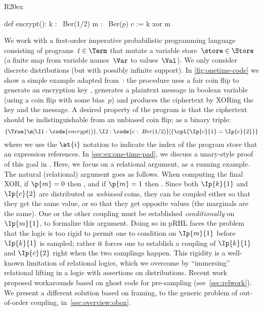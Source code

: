 \documentclass[acmsmall,nonacm,screen,appendix]{acmart}
\begin{document}
\begin{wrapfigure}[7]{R}{20ex}\begin{sourcecode*}[linewidth=.9\linewidth,xleftmargin=.1\linewidth,
    belowskip=-.5em,aboveskip=-1em,
    gobble=2
  ]
  def encrypt():
    k :~ Ber(1/2)
    m :~ Ber($p$)
    c := k xor m
  \end{sourcecode*}\caption{One time pad.}
  \label{fig:onetime-code}
\end{wrapfigure}
We work with a first-order imperative probabilistic programming language
consisting of programs~$t\in\Term$ that mutate a variable store~$\store\in\Store$
(\ie a finite map from variable names~$\Var$ to values~$\Val$).
We only consider discrete distributions
(but with possibly infinite support).
In \cref{fig:onetime-code} we show a simple example adapted from~\cite{barthe2019probabilistic}:
the  procedure uses a fair coin flip to generate an encryption key
, generates a plaintext message in boolean variable 
(using a coin flip with some bias~$p$)
and produces the ciphertext  by XORing the key and the message.
A desired property of the program is that the ciphertext should be
indistinguishable from an unbiased coin flip; as a binary triple:
\begin{equation}
  \{\True\}
  \m[
    \I1: \code{encrypt()},
    \I2: \code{c:~Ber(1/2)}
  ]
  \{
    \cpl{ \Ip{c}{1}=\Ip{c}{2} }
  \}
  \label{ex:xor:goal}
\end{equation}
where we use the $\at{i}$ notation to indicate the index of the program store that an expression references.
In \cref{sec:ex:one-time-pad}, we discuss a unary-style proof of this goal in \thelogic. Here, we focus on a relational argument, as a running example. The natural (relational) argument goes as follows.
When computing the final XOR,
  if $\p{m}=0$ then ,
  and if $\p{m}=1$ then .
Since both $\Ip{k}{1}$ and $\Ip{c}{2}$ are distributed as \emph{unbiased} coins,
they can be coupled either so that they get the same value,
or so that they get opposite values (the marginals are the same).
One or the other coupling must be established
\emph{conditionally} on~$\Ip{m}{1}$, to formalize this argument.
Doing so in pRHL faces the problem that the logic is too rigid to permit one to
condition on $\Ip{m}{1}$ before $\Ip{k}{1}$ is sampled; rather it forces one to establish a coupling of $\Ip{k}{1}$ and $\Ip{c}{2}$ right when the two samplings happen.
This rigidity is a well-known limitation of relational logics,
which we overcome by ``immersing'' relational lifting
in a logic with assertions on distributions.
Recent work~\cite{gregersen2023asynchronous}
proposed workarounds based on ghost code for pre-sampling
(see~\cref{sec:relwork}).
We present a different solution based on framing, to the generic problem of out-of-order coupling, in~\cref{sec:overview:obox}.
\end{document}
